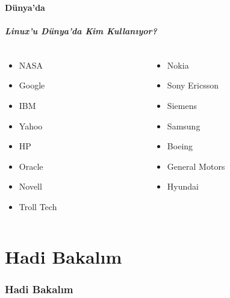 \documentclass{beamer}
\begin{document}
	\subsection{Dünya'da}
		\begin{frame}
		 	\frametitle{Linux'u Dünya'da Kim Kullanıyor?}
			\begin{columns}
			\begin{column}[l]{5cm}
				\begin{itemize}
					\item NASA
					\item Google
					\item IBM
					\item Yahoo
					\item HP
					\item Oracle
					\item Novell
					\item Troll Tech
				\end{itemize}
			\end{column}
			\begin{column}[r]{5cm}
				\begin{itemize}
					\item Nokia
					\item Sony Ericsson
					\item Siemens
					\item Samsung
					\item Boeing
					\item General Motors
					\item Hyundai	
				\end{itemize}
			\end{column}
			\end{columns}

		\end{frame}
\part{Hadi Bakalım}
\section {Hadi Bakalım}
	
\end{document}
